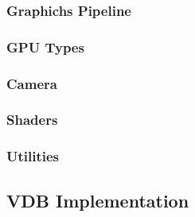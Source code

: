 \subsubsection{Graphichs Pipeline}
\subsubsection{GPU Types}
\subsubsection{Camera}
\subsubsection{Shaders}
\subsubsection{Utilities}

\subsection{VDB Implementation}
